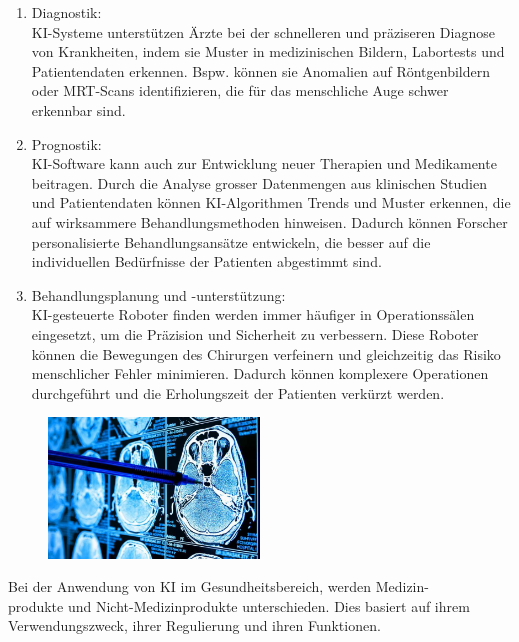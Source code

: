 \documentclass{article}
\begin{document}
\begin{enumerate}
    \item Diagnostik: \\KI-Systeme unterstützen Ärzte bei der schnelleren und präziseren Diagnose 
    von Krankheiten, indem sie Muster in medizinischen Bildern, Labortests und Patientendaten erkennen.
    Bspw. können sie Anomalien auf Röntgenbildern oder MRT-Scans identifizieren, die für das menschliche 
    Auge schwer erkennbar sind.
    \item Prognostik: \\KI-Software kann auch zur Entwicklung neuer Therapien und Medikamente beitragen. 
    Durch die Analyse grosser Datenmengen aus klinischen Studien und Patientendaten können KI-Algorithmen 
    Trends und Muster erkennen, die auf wirksammere Behandlungsmethoden hinweisen. Dadurch können Forscher 
    personalisierte Behandlungsansätze entwickeln, die besser auf die individuellen Bedürfnisse der 
    Patienten abgestimmt sind. 
    \item Behandlungsplanung und -unterstützung: \\KI-gesteuerte Roboter finden werden immer häufiger in
    Operationssälen eingesetzt, um die Präzision und Sicherheit zu verbessern. Diese Roboter können
    die Bewegungen des Chirurgen verfeinern und gleichzeitig das Risiko menschlicher Fehler minimieren. 
    Dadurch können komplexere Operationen durchgeführt und die Erholungszeit der Patienten verkürzt werden. 
\end{enumerate} \citep{mauriceneumann.de}

\begin{figure}[H]
    \centering
    \includegraphics[width=0.5\textwidth]{fotitooppa.jpg}
    \label{fig:fotitooppa}
\end{figure}

\newpage
Bei der Anwendung von KI im Gesundheitsbereich, werden Medizin-\\produkte und Nicht-Medizinprodukte 
unterschieden. Dies basiert auf ihrem Verwendungszweck, ihrer Regulierung und ihren Funktionen.
\end{document}

